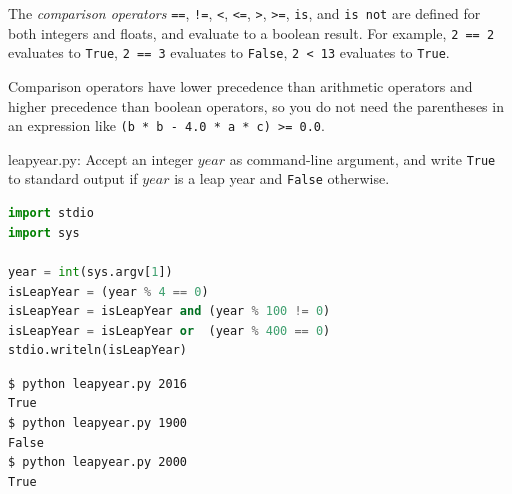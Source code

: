 \documentclass[8pt,a4paper,compress,handout]{beamer}
\begin{document}
\begin{frame}[fragile]
The \emph{comparison operators} \lstinline{==}, \lstinline{!=}, \lstinline{<}, \lstinline{<=}, \lstinline{>}, \lstinline{>=}, \lstinline{is}, and \lstinline{is not} are defined for both integers and floats, and evaluate to a boolean result. For example, \lstinline{2 == 2} evaluates to \lstinline{True}, \lstinline{2 == 3} evaluates to \lstinline{False}, \lstinline{2 < 13} evaluates to \lstinline{True}. 

\bigskip

Comparison operators have lower precedence than arithmetic operators and higher precedence than boolean operators, so you do not need the parentheses in an expression like \lstinline{(b * b - 4.0 * a * c) >= 0.0}.
\end{frame}

\begin{frame}[fragile]
\begin{framed}
\tiny leapyear.py: Accept an integer $year$ as command-line argument, and write \lstinline{True} to standard output if $year$ is a leap year and \lstinline{False} otherwise. 
\end{framed}

\begin{lstlisting}[language=Python]
import stdio
import sys

year = int(sys.argv[1])
isLeapYear = (year % 4 == 0)
isLeapYear = isLeapYear and (year % 100 != 0)
isLeapYear = isLeapYear or  (year % 400 == 0)
stdio.writeln(isLeapYear)
\end{lstlisting}

\begin{lstlisting}[language={}]
$ python leapyear.py 2016
True
$ python leapyear.py 1900
False
$ python leapyear.py 2000
True
\end{lstlisting}
\end{frame}
\end{document}
